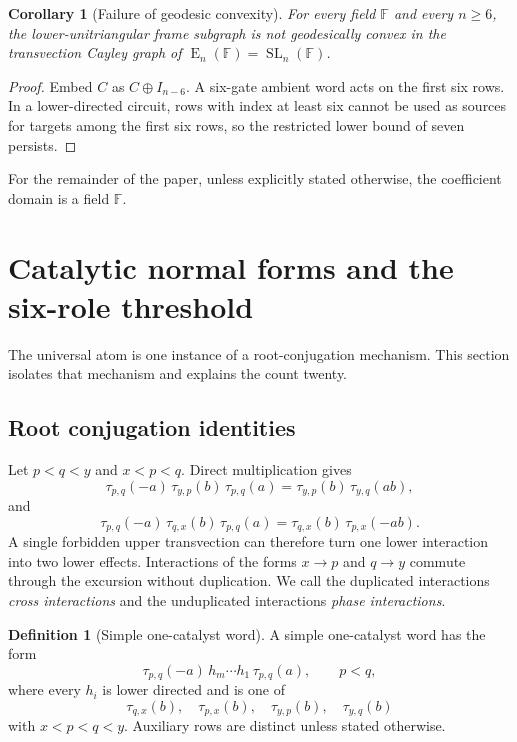\documentclass[11pt]{amsart}
\numberwithin{equation}{section}
\newtheorem{corollary}[theorem]{Corollary}
\theoremstyle{definition}
\newtheorem{definition}[theorem]{Definition}
\theoremstyle{remark}
\newcommand{\F}{\mathbb F}
\newcommand{\SL}{\operatorname{SL}}
\newcommand{\Egrp}{\operatorname{E}}
\begin{document}
\begin{corollary}[Failure of geodesic convexity]\label{cor:nonconvex}
For every field $\F$ and every $n\ge6$, the lower-unitriangular frame subgraph is not geodesically convex in the transvection Cayley graph of $\Egrp_n(\F)=\SL_n(\F)$.
\end{corollary}

\begin{proof}
Embed $C$ as $C\oplus I_{n-6}$.  A six-gate ambient word acts on the first six rows.  In a lower-directed circuit, rows with index at least six cannot be used as sources for targets among the first six rows, so the restricted lower bound of seven persists.
\end{proof}

For the remainder of the paper, unless explicitly stated otherwise, the coefficient domain is a field $\F$.

\section{Catalytic normal forms and the six-role threshold}\label{sec:catalysis}

The universal atom is one instance of a root-conjugation mechanism.  This section isolates that mechanism and explains the count twenty.

\subsection{Root conjugation identities}

Let $p<q<y$ and $x<p<q$.  Direct multiplication gives
\begin{equation}\label{eq:read-conjugation}
\tau_{p,q}(-a)\,\tau_{y,p}(b)\,\tau_{p,q}(a)
=
\tau_{y,p}(b)\,\tau_{y,q}(ab),
\end{equation}
and
\begin{equation}\label{eq:update-conjugation}
\tau_{p,q}(-a)\,\tau_{q,x}(b)\,\tau_{p,q}(a)
=
\tau_{q,x}(b)\,\tau_{p,x}(-ab).
\end{equation}
A single forbidden upper transvection can therefore turn one lower interaction into two lower effects.  Interactions of the forms $x\to p$ and $q\to y$ commute through the excursion without duplication.  We call the duplicated interactions \emph{cross interactions} and the unduplicated interactions \emph{phase interactions}.

\begin{definition}[Simple one-catalyst word]\label{def:simple-catalyst}
A simple one-catalyst word has the form
\[
\tau_{p,q}(-a)\,h_m\cdots h_1\,\tau_{p,q}(a),
\qquad p<q,
\]
where every $h_i$ is lower directed and is one of
\[
\tau_{q,x}(b),\quad \tau_{p,x}(b),\quad
\tau_{y,p}(b),\quad \tau_{y,q}(b)
\]
with $x<p<q<y$.  Auxiliary rows are distinct unless stated otherwise.
\end{definition}
\end{document}
